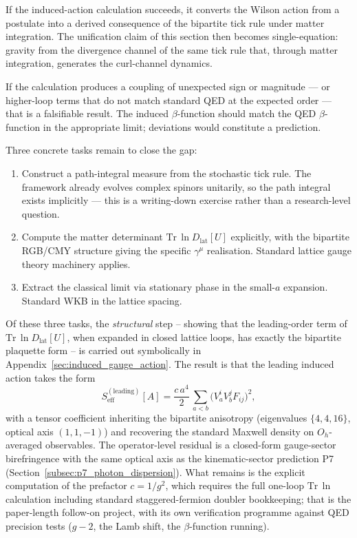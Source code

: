 If the induced-action calculation succeeds, it converts the Wilson
action from a postulate into a derived consequence of the bipartite
tick rule under matter integration. The unification claim of this
section then becomes single-equation: gravity from the divergence
channel of the same tick rule that, through matter integration,
generates the curl-channel dynamics.

If the calculation produces a coupling of unexpected sign or magnitude
--- or higher-loop terms that do not match standard QED at the
expected order --- that is a falsifiable result. The induced
$\beta$-function should match the QED $\beta$-function in the
appropriate limit; deviations would constitute a prediction.

Three concrete tasks remain to close the gap:

\begin{enumerate}
    \item Construct a path-integral measure from the stochastic tick
    rule. The framework already evolves complex spinors unitarily, so
    the path integral exists implicitly --- this is a writing-down
    exercise rather than a research-level question.
    \item Compute the matter determinant
    $\mathrm{Tr}\,\ln D_\text{lat}[U]$ explicitly, with the
    bipartite RGB/CMY structure giving the specific $\gamma^\mu$
    realisation. Standard lattice gauge theory machinery applies.
    \item Extract the classical limit via stationary phase in the
    small-$a$ expansion. Standard WKB in the lattice spacing.
\end{enumerate}

Of these three tasks, the \emph{structural} step -- showing that
the leading-order term of $\mathrm{Tr}\,\ln D_\text{lat}[U]$, when
expanded in closed lattice loops, has exactly the bipartite plaquette
form -- is carried out symbolically in
Appendix~\ref{sec:induced_gauge_action}.  The result is that the
leading induced action takes the form
\begin{equation*}
    S_\text{eff}^{(\text{leading})}[A]
        = \frac{c\,a^4}{2}\,\sum_{a<b}\bigl(V_a^i V_b^j F_{ij}\bigr)^2,
\end{equation*}
with a tensor coefficient inheriting the bipartite anisotropy
(eigenvalues $\{4, 4, 16\}$, optical axis $(1,1,-1)$) and recovering
the standard Maxwell density on $O_h$-averaged observables.  The
operator-level residual is a closed-form gauge-sector birefringence
with the same optical axis as the kinematic-sector prediction P7
(Section~\ref{subsec:p7_photon_dispersion}).
What remains is the explicit computation of the prefactor $c = 1/g^2$,
which requires the full one-loop $\mathrm{Tr}\,\ln$ calculation
including standard staggered-fermion doubler bookkeeping; that is the
paper-length follow-on project, with its own verification programme
against QED precision tests ($g{-}2$, the Lamb shift, the
$\beta$-function running).

